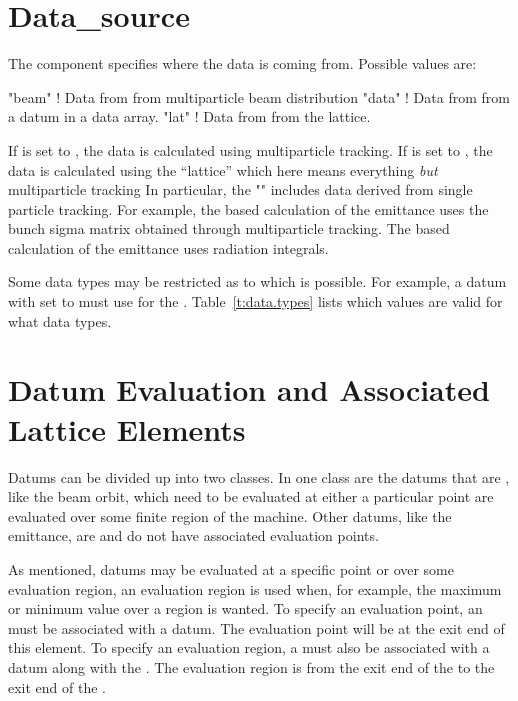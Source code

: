 \section{Data_source}
\label{s:data.source}

The  component specifies where the data is 
coming from. Possible values are:
\begin{example}
  "beam"        ! Data from from multiparticle beam distribution
  "data"        ! Data from from a \tao datum in a data array.
  "lat"         ! Data from from the lattice.
\end{example}
If  is set to , the data is calculated
using multiparticle tracking.  If  is set to
, the data is calculated using the ``lattice'' which here
means everything {\em but} multiparticle tracking In particular, the "" 
includes data derived from single particle tracking. For example, the
 based calculation of the emittance uses the bunch sigma
matrix obtained through multiparticle tracking. The  based
calculation of the emittance uses radiation integrals.

Some data types may be restricted as to which  is
possible. For example, a datum with  set to
 must use  for the . 
Table~\ref{t:data.types} lists which  values are valid
for what data types.

\section{Datum Evaluation and Associated Lattice Elements}
\label{s:data.lat.ele}

Datums can be divided up into two classes. In one class are the datums
that are , like the beam orbit, which need to be evaluated at
either a particular point are evaluated over some finite region of the
machine. Other datums, like the emittance, are  and do not
have associated evaluation points.

As mentioned,  datums may be evaluated at a specific point
or over some evaluation region, an evaluation region is used when, for
example, the maximum or minimum value over a region is wanted. To
specify an evaluation point, an  must be
associated with a datum. The evaluation point will be at the exit end
of this element. To specify an evaluation region, a 
must also be associated with a datum along with the . The evaluation region is from the exit end of the  to the exit end of the .

